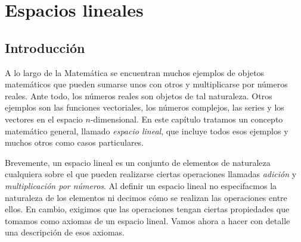 \chapter{Espacios lineales}

\section{Introducción}

A lo largo de la Matemática se encuentran muchos ejemplos de objetos matemáticos que pueden sumarse unos con otros y multiplicarse por números reales. Ante todo, los números reales son objetos de tal naturaleza. Otros ejemplos son las funciones vectoriales, los números complejos, las series y los vectores en el espacio $n$-dimensional. En este capítulo tratamos un concepto matemático general, llamado {\it espacio lineal}, que incluye todos esos ejemplos y muchos otros como casos particulares.

Brevemente, un espacio lineal es un conjunto de elementos de naturaleza cualquiera sobre el que pueden realizarse ciertas operaciones llamadas {\it adición} y {\it multiplicación por números}. Al definir un espacio lineal no especifacmos la naturaleza de los elementos ni decimos cómo se realizan las operaciones entre ellos. En cambio, exigimos que las operaciones tengan ciertas propiedades que tomamos como axiomas de un espacio lineal. Vamos ahora a hacer con detalle una descripción de esos axiomas.